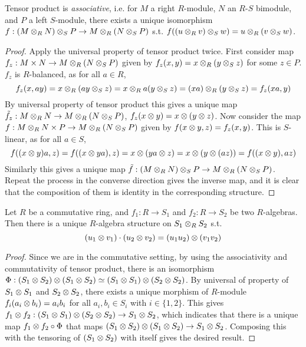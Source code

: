 \documentclass{article}
\begin{document}
\begin{proposition}
    Tensor product is \emph{associative}, i.e. for $M$ a right $R$-module, $N$ an $R$-$S$ bimodule, and $P$ a left $S$-module, there exists a unique isomorphism $f: (M \otimes_R N) \otimes_S P \to M \otimes_R (N \otimes_S P)$ s.t. $f((u \otimes_R v) \otimes_S w) = u \otimes_R (v \otimes_S w)$.
\end{proposition}

\begin{proof}
    Apply the universal property of tensor product twice. First consider map $f_z: M \times N \to M \otimes_R (N \otimes_S P)$ given by $f_z(x, y) = x \otimes_R (y \otimes_S z)$ for some $z \in P$. $f_z$ is $R$-balanced, as for all $a \in R$, 
    \[
        f_z(x, ay) = x\otimes_R (ay \otimes_S z) = x \otimes_R a(y \otimes_S z) = (xa) \otimes_R (y \otimes_S z) = f_z(xa, y)
    \]
    By universal property of tensor product this gives a unique map $\tilde{f_z}: M \otimes_R N \to M \otimes_R (N \otimes_S P)$, $f_z(x \otimes y) = x \otimes (y \otimes z)$. Now consider the map $f: M \otimes_R N \times P \to M \otimes_R (N \otimes_S P)$ given by $f(x \otimes y, z) = f_z(x, y)$. This is $S$-linear, as for all $a \in S$,
    \[
        f((x \otimes y)a, z) = f((x \otimes ya), z) = x \otimes (ya \otimes z) = x \otimes (y \otimes (az)) = f((x \otimes y), az)
    \]
    Similarly this gives a unique map $\tilde{f}: (M \otimes_R N) \otimes_S P \to M \otimes_R (N \otimes_S P)$. Repeat the process in the converse direction gives the inverse map, and it is clear that the composition of them is identity in the corresponding structure.
\end{proof}

\begin{proposition}
    Let $R$ be a commutative ring, and $f_1: R \to S_1$ and $f_2: R \to S_2$ be two $R$-algebras. Then there is a unique $R$-algebra structure on $S_1 \otimes_R S_2$ s.t. 
    \[
        (u_1 \otimes v_1) \cdot (u_2 \otimes v_2) = (u_1 u_2) \otimes (v_1 v_2)
    \]
\end{proposition}

\begin{proof}
    Since we are in the commutative setting, by using the associativity and commutativity of tensor product, there is an isomorphism $\Phi: (S_1 \otimes S_2) \otimes (S_1 \otimes S_2) \simeq (S_1 \otimes S_1) \otimes (S_2 \otimes S_2)$. By universal of property of $S_1 \otimes S_1$ and $S_2 \otimes S_2$, there exists a unique morphism of $R$-module $f_i(a_i \otimes b_i) = a_i b_i$ for all $a_i, b_i \in S_i$ with $i\in \{1, 2\}$. This gives $f_1 \otimes f_2: (S_1 \otimes S_1) \otimes (S_2 \otimes S_2) \to S_1 \otimes S_2$, which indicates that there is a unique map $f_1 \otimes f_2 \circ \Phi$ that maps $(S_1 \otimes S_2) \otimes (S_1 \otimes S_2) \to S_1 \otimes S_2$. Composing this with the tensoring of $(S_1 \otimes S_2)$ with itself gives the desired result.
\end{proof}
\end{document}

